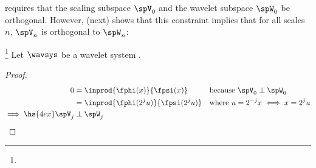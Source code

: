 %
 requires that the scaling subspace $\spV_0$ and
the wavelet subspace $\spW_0$ be orthogonal.
However,  (next) shows that
this constraint implies that for all scales $n$, $\spV_n$ is orthogonal to $\spW_n$:
\begin{proposition}
\label{prop:VperpW}
\footnote{
  }
Let $\wavsys$ be a wavelet system .
\end{proposition}
\begin{proof}
  \begin{align*}
    0
      &= \inprod{\fphi(x)}{\fpsi(x)}
      && \text{because $\spV_0 \perp \spW_0$}
    \\&= \inprod{\fphi(2^ju)}{\fpsi(2^ju)}
      && \text{where } u=2^{-j}x \iff x=2^ju
    \\ \implies \hs{4ex} \spV_j &\perp \spW_j
  \end{align*}
\end{proof}


